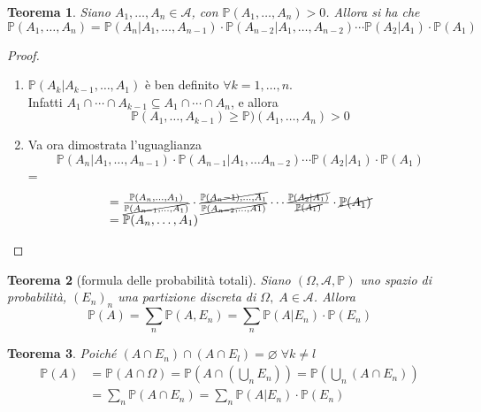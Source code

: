 \documentclass[a4paper,12pt]{article}
\theoremstyle{break}
\newtheorem{theorem}{Teorema}[section]
\let\emptyset\varnothing
\numberwithin{equation}{section}
\begin{document}
\begin{theorem}
  Siano \(A_1, \ldots, A_n \in \mathcal{A}\), con \(\mathbb{P}(A_1, \ldots, A_n) > 0\). Allora si ha che 
  \[
    \mathbb{P}(A_1, \ldots, A_n) = \mathbb{P}(A_n\vert A_1, \ldots, A_{n-1}) \cdot \mathbb{P}(A_{n-2}\vert A_1, \ldots, A_{n-2}) \cdots \mathbb{P}(A_2\vert A_1) \cdot \mathbb{P}(A_1)
  \]
\end{theorem}
\begin{proof}
  \begin{enumerate}
    \item \(\mathbb{P}(A_k\vert A_{k-1}, \ldots, A_1)\) è ben definito \(\forall k = 1, \ldots, n\). \\
    Infatti \(A_1 \cap \cdots \cap A_{k-1} \subseteq A_1 \cap \cdots \cap A_n\), e allora
    \[
      \mathbb{P}(A_1, \ldots, A_{k-1}) \geq \mathbb{P})(A_1, \ldots, A_n) > 0
    \]
    \item Va ora dimostrata l'uguaglianza 
    \[
      \mathbb{P}(A_n \vert A_1, \ldots, A_{n-1}) \cdot \mathbb{P}(A_{n-1}\vert A_1, \ldots A_{n-2}) \cdots \mathbb{P}(A_2\vert A_1)\cdot \mathbb{P}(A_1)
    \]
    {\everymath = {\displaystyle}\[
      \begin{array}{l}
        = \frac{\mathbb{P}(A_n, \ldots, A_1)}{\cancel{{\mathbb{P}(A_{n-1},\ldots, A_1)}}} \cdot \frac{\cancel{\mathbb{P}(A_n-1), \ldots, A_1}}{\cancel{\mathbb{P}(A_{n-2}, \ldots, A1)}} \cdots \frac{\cancel{\mathbb{P}(A_2\vert A_1)}}{\cancel{\mathbb{P}(A_1)}} \cdot \cancel{\mathbb{P}(A_1)} \\
        = \mathbb{P}(A_n, \ldots, A_1)
      \end{array}
    \]}
  \end{enumerate}
\end{proof}
\begin{theorem}[formula delle probabilità totali]
  Siano \((\Omega, \mathcal{A}, \mathbb{P})\) uno spazio di probabilità, \((E_n)_n\) una partizione discreta di \(\Omega, \; A \in \mathcal{A}\).
  Allora
  \[
    \mathbb{P}(A) = \sum_n \mathbb{P}(A, E_n) = \sum_n \mathbb{P} (A|E_n) \cdot \mathbb{P}(E_n)
   \]
\end{theorem}
\begin{theorem}
  Poiché \((A \cap E_n) \cap (A \cap E_l) = \emptyset \; \forall k \not = l\)
  \[
  \begin{array}{ll}
    \mathbb{P}(A) & = \mathbb{P}(A \cap \Omega) = \mathbb{P}\left(A \cap \left(\bigcup_n E_n\right)\right) = \mathbb{P}\left(\bigcup_n \left(A \cap E_n\right)\right) \\
    & = \sum_n \mathbb{P}(A \cap E_n) = \sum_n \mathbb{P}(A\vert E_n)\cdot \mathbb{P}(E_n) 
  \end{array}
  \]
\end{theorem}
\end{document}
